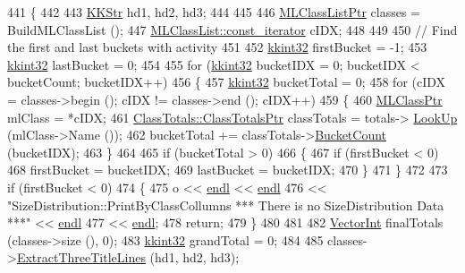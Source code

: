\begin{DoxyCode}
441 \{
442 
443   \hyperlink{class_k_k_b_1_1_k_k_str}{KKStr}  hd1, hd2, hd3;
444 
445 
446   \hyperlink{class_k_k_m_l_l_1_1_m_l_class_list}{MLClassListPtr}  classes = BuildMLClassList ();
447   \hyperlink{class_k_k_b_1_1_k_k_queue_aeb057c9c010446f46f57c1e355f981f1}{MLClassList::const\_iterator}  cIDX;
448  
449 
450   \textcolor{comment}{// Find the first and last buckets with activity}
451   
452   \hyperlink{namespace_k_k_b_a8fa4952cc84fda1de4bec1fbdd8d5b1b}{kkint32}  firstBucket = -1;
453   \hyperlink{namespace_k_k_b_a8fa4952cc84fda1de4bec1fbdd8d5b1b}{kkint32}  lastBucket = 0;
454   
455   \textcolor{keywordflow}{for}  (\hyperlink{namespace_k_k_b_a8fa4952cc84fda1de4bec1fbdd8d5b1b}{kkint32} bucketIDX = 0;  bucketIDX < bucketCount;  bucketIDX++)
456   \{
457     \hyperlink{namespace_k_k_b_a8fa4952cc84fda1de4bec1fbdd8d5b1b}{kkint32}  bucketTotal = 0;
458     \textcolor{keywordflow}{for}  (cIDX = classes->begin ();  cIDX != classes->end ();  cIDX++)
459     \{
460       \hyperlink{class_k_k_m_l_l_1_1_m_l_class}{MLClassPtr}  mlClass = *cIDX;
461       \hyperlink{class_size_distribution_1_1_class_totals_a2686de1099514e243ffe29eef7c0ed03}{ClassTotals::ClassTotalsPtr}  classTotals = totals->
      \hyperlink{class_size_distribution_1_1_class_totals_list_a02a7ba9ba316f307794c4a5183fe9fd6}{LookUp} (mlClass->Name ());
462       bucketTotal += classTotals->\hyperlink{class_size_distribution_1_1_class_totals_a7f2650dd7bf999bb3bd7d6d47be44205}{BucketCount} (bucketIDX);
463     \}
464 
465     \textcolor{keywordflow}{if}  (bucketTotal > 0)
466     \{
467       \textcolor{keywordflow}{if}  (firstBucket < 0)
468         firstBucket = bucketIDX;
469       lastBucket = bucketIDX;
470     \}
471   \}
472 
473   \textcolor{keywordflow}{if}  (firstBucket < 0)
474   \{
475     o << \hyperlink{namespace_k_k_b_ad1f50f65af6adc8fa9e6f62d007818a8}{endl} << \hyperlink{namespace_k_k_b_ad1f50f65af6adc8fa9e6f62d007818a8}{endl}
476       << \textcolor{stringliteral}{"SizeDistribution::PrintByClassCollumns     *** There is no SizeDistribution Data ***"} << 
      \hyperlink{namespace_k_k_b_ad1f50f65af6adc8fa9e6f62d007818a8}{endl}
477       << \hyperlink{namespace_k_k_b_ad1f50f65af6adc8fa9e6f62d007818a8}{endl};
478     \textcolor{keywordflow}{return};
479   \}
480 
481 
482   \hyperlink{namespace_k_k_b_a791ebe73f89917067a7aab9dbd817e45}{VectorInt}  finalTotals (classes->size (), 0);
483   \hyperlink{namespace_k_k_b_a8fa4952cc84fda1de4bec1fbdd8d5b1b}{kkint32}    grandTotal = 0;
484 
485   classes->\hyperlink{class_k_k_m_l_l_1_1_m_l_class_list_ab333df46b706048637bb7b98ef552f59}{ExtractThreeTitleLines} (hd1, hd2, hd3);

\end{DoxyCode}
